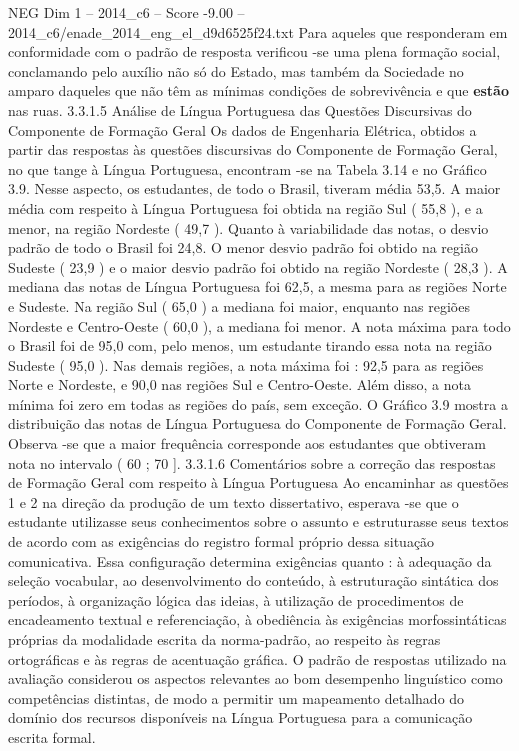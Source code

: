 \begin{textsample}{NEG Dim 1 – 2014\_c6 – Score -9.00 – 2014\_c6/enade\_2014\_eng\_el\_d9d6525f24.txt}
Para aqueles que responderam em conformidade com o padrão de resposta verificou -se uma plena formação social, conclamando pelo auxílio não só do Estado, mas também da Sociedade no amparo daqueles que não têm as mínimas condições de sobrevivência e que \textbf{estão} nas ruas. 3.3.1.5 Análise de Língua Portuguesa das Questões Discursivas do Componente de Formação Geral Os dados de Engenharia Elétrica, obtidos a partir das respostas às questões discursivas do Componente de Formação Geral, no que tange à Língua Portuguesa, encontram -se na Tabela 3.14 e no Gráfico 3.9.
Nesse aspecto, os estudantes, de todo o Brasil, tiveram média 53,5.
A maior média com respeito à Língua Portuguesa foi obtida na região Sul ( 55,8 ), e a menor, na região Nordeste ( 49,7 ).
Quanto à variabilidade das notas, o desvio padrão de todo o Brasil foi 24,8.
O menor desvio padrão foi obtido na região Sudeste ( 23,9 ) e o maior desvio padrão foi obtido na região Nordeste ( 28,3 ).
A mediana das notas de Língua Portuguesa foi 62,5, a mesma para as regiões Norte e Sudeste.
Na região Sul ( 65,0 ) a mediana foi maior, enquanto nas regiões Nordeste e Centro-Oeste ( 60,0 ), a mediana foi menor.
A nota máxima para todo o Brasil foi de 95,0 com, pelo menos, um estudante tirando essa nota na região Sudeste ( 95,0 ).
Nas demais regiões, a nota máxima foi : 92,5 para as regiões Norte e Nordeste, e 90,0 nas regiões Sul e Centro-Oeste.
Além disso, a nota mínima foi zero em todas as regiões do país, sem exceção.
O Gráfico 3.9 mostra a distribuição das notas de Língua Portuguesa do Componente de Formação Geral.
Observa -se que a maior frequência corresponde aos estudantes que obtiveram nota no intervalo ( 60 ; 70 ]. 3.3.1.6 Comentários sobre a correção das respostas de Formação Geral com respeito à Língua Portuguesa Ao encaminhar as questões 1 e 2 na direção da produção de um texto dissertativo, esperava -se que o estudante utilizasse seus conhecimentos sobre o assunto e estruturasse seus textos de acordo com as exigências do registro formal próprio dessa situação comunicativa.
Essa configuração determina exigências quanto : à adequação da seleção vocabular, ao desenvolvimento do conteúdo, à estruturação sintática dos períodos, à organização lógica das ideias, à utilização de procedimentos de encadeamento textual e referenciação, à obediência às exigências morfossintáticas próprias da modalidade escrita da norma-padrão, ao respeito às regras ortográficas e às regras de acentuação gráfica.
O padrão de respostas utilizado na avaliação considerou os aspectos relevantes ao bom desempenho linguístico como competências distintas, de modo a permitir um mapeamento detalhado do domínio dos recursos disponíveis na Língua Portuguesa para a comunicação escrita formal.

\end{textsample}
